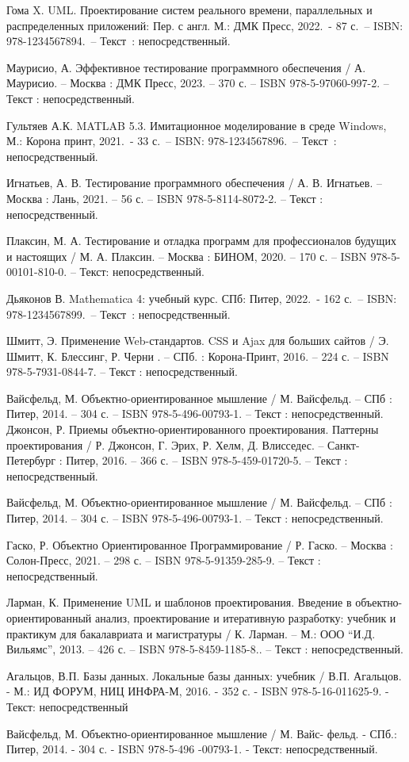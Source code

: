 \begin{thebibliography}{9}
 Гома X. UML. Проектирование систем реального времени, параллельных и распределенных приложений: Пер. с англ. М.: ДМК Пресс, 2022.~- 87 с.~– ISBN: 978-1234567894.~– Текст~: непосредственный.

 Маурисио, А. Эффективное тестирование программного обеспечения / А. Маурисио. – Москва : ДМК Пресс, 2023. – 370 с. – ISBN 978-5-97060-997-2. – Текст : непосредственный.

 Гультяев А.К. MATLAB 5.3. Имитационное моделирование в среде Windows, М.: Корона принт, 2021.~- 33 с.~– ISBN: 978-1234567896.~– Текст~: непосредственный.

 Игнатьев, А. В. Тестирование программного обеспечения / А. В. Игнатьев. – Москва : Лань, 2021. – 56 с. – ISBN 978-5-8114-8072-2. – Текст : непосредственный.

 Плаксин, М. А. Тестирование и отладка программ для профессионалов будущих и настоящих / М. А. Плаксин. – Москва : БИНОМ, 2020. – 170 с. – ISBN 978-5-00101-810-0. – Текст: непосредственный.

 Дьяконов В. Mathematica 4: учебный курс. СПб: Питер, 2022.~- 162 с.~– ISBN: 978-1234567899.~– Текст~: непосредственный.

 Шмитт, Э. Применение Web-стандартов. CSS и Ajax для больших сайтов / Э. Шмитт, К. Блессинг, Р. Черни . – СПб. : Корона-Принт, 2016. – 224 с. – ISBN 978-5-7931-0844-7. – Текст : непосредственный.

Вайсфельд,	М.	Объектно-ориентированное	мышление	/	М. Вайсфельд. – СПб : Питер, 2014. – 304 с. – ISBN 978-5-496-00793-1. – Текст :
непосредственный.
 Джонсон, Р. Приемы объектно-ориентированного проектирования. Паттерны проектирования / Р. Джонсон, Г. Эрих, Р. Хелм, Д. Влисседес. – Санкт-Петербург : Питер, 2016. – 366 с. – ISBN 978-5-459-01720-5. – Текст : непосредственный.

 Вайсфельд,	М.	Объектно-ориентированное	мышление	/	М. Вайсфельд. – СПб : Питер, 2014. – 304 с. – ISBN 978-5-496-00793-1. – Текст :
непосредственный.


 Гаско, Р. Объектно Ориентированное Программирование / Р. Гаско. – Москва : Солон-Пресс, 2021. – 298 с. – ISBN 978-5-91359-285-9. – Текст :
непосредственный.


 Ларман, К. Применение UML и шаблонов проектирования. Введение в объектно-ориентированный анализ, проектирование и итеративную разработку: учебник и практикум для бакалавриата и магистратуры / К. Ларман. – М.: ООО “И.Д. Вильямс”, 2013. – 426 с. – ISBN 978-5-8459-1185-8.. – Текст : непосредственный.

 Агальцов, В.П. Базы данных. Локальные базы данных: учебник /
В.П. Агальцов. - М.: ИД ФОРУМ, НИЦ ИНФРА-М, 2016. - 352 с. - ISBN
978-5-16-011625-9. - Текст: непосредственный

 Вайсфельд, М. Объектно-ориентированное мышление / М. Вайс- фельд. - СПб.: Питер, 2014. - 304 с. - ISBN 978-5-496 -00793-1. - Текст: непосредственный.

\end{thebibliography}
